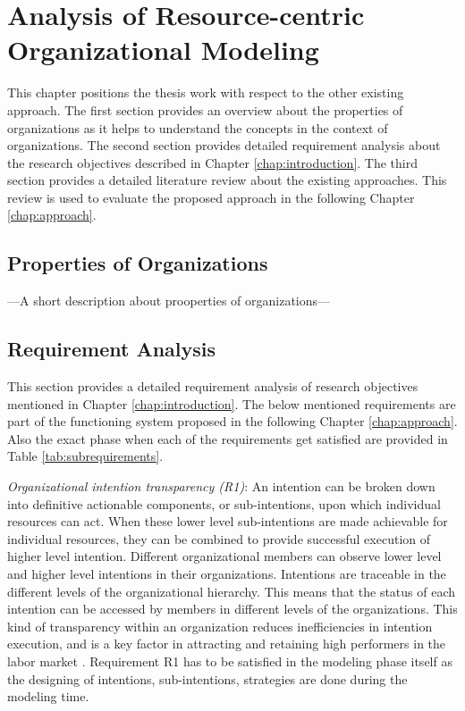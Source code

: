 \chapter{Analysis of Resource-centric Organizational Modeling}
\label{chap:analysis}

This chapter positions the thesis work with respect to the other existing approach. The first section provides an overview about the properties of organizations as it helps to understand the concepts in the context of organizations. The second section provides detailed requirement analysis about the research objectives described in Chapter \ref{chap:introduction}. The third section provides a detailed literature review about the existing approaches. This review is used to evaluate the proposed approach in the following Chapter \ref{chap:approach}.



\section{Properties of Organizations}
\label{sec:propertiesorganization}
---A short description about prooperties of organizations---


\section{Requirement Analysis}
\label{sec:requirementssupoorting}
This section provides a detailed requirement analysis of research objectives mentioned in Chapter \ref{chap:introduction}. The below mentioned requirements are part of the functioning system proposed in the following Chapter \ref{chap:approach}. Also the exact phase when each of the requirements get satisfied are provided in Table \ref{tab:subrequirements}.


\textit{Organizational intention transparency (R1)}:  An intention can be broken down into definitive actionable components, or sub-intentions, upon which individual resources can act. When these lower level sub-intentions are made  achievable for individual resources, they can be combined to provide successful execution of higher level intention. Different organizational members can observe lower level and higher level intentions in their organizations. Intentions are traceable in the different levels of the organizational hierarchy. This means that the status of each intention can be accessed by members in different levels of the organizations. This kind of transparency within an organization reduces inefficiencies in intention execution, and is a key factor in attracting and retaining high  performers in the labor market \cite{McManus2007}. Requirement R1 has to be satisfied in the modeling phase itself as the designing of intentions, sub-intentions, strategies are done during the modeling time. 


